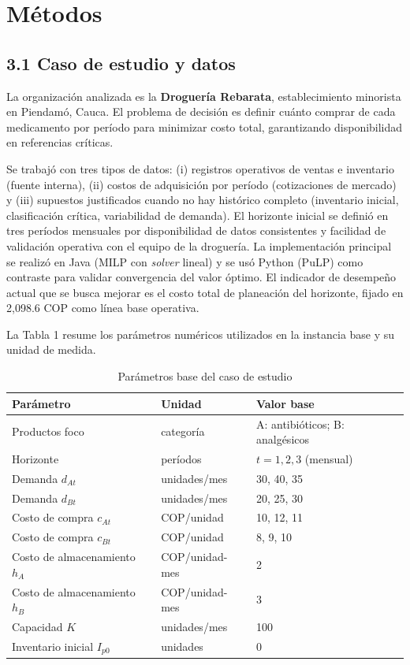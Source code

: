 \documentclass[12pt,letterpaper]{article}
\begin{document}
\section{Métodos}
\subsection{3.1 Caso de estudio y datos}
La organización analizada es la \textbf{Droguería Rebarata}, establecimiento minorista en Piendamó, Cauca. El problema de decisión es definir cuánto comprar de cada medicamento por período para minimizar costo total, garantizando disponibilidad en referencias críticas.

Se trabajó con tres tipos de datos: (i) registros operativos de ventas e inventario (fuente interna), (ii) costos de adquisición por período (cotizaciones de mercado) y (iii) supuestos justificados cuando no hay histórico completo (inventario inicial, clasificación crítica, variabilidad de demanda). El horizonte inicial se definió en tres períodos mensuales por disponibilidad de datos consistentes y facilidad de validación operativa con el equipo de la droguería. La implementación principal se realizó en Java (MILP con \textit{solver} lineal) y se usó Python (PuLP) como contraste para validar convergencia del valor óptimo. El indicador de desempeño actual que se busca mejorar es el costo total de planeación del horizonte, fijado en 2,098.6 COP como línea base operativa.

La Tabla 1 resume los parámetros numéricos utilizados en la instancia base y su unidad de medida.
\begin{table}[H]
\centering
\caption{Parámetros base del caso de estudio}
\begin{tabular}{|p{4.5cm}|p{4cm}|p{4.5cm}|}
\hline
\textbf{Parámetro} & \textbf{Unidad} & \textbf{Valor base} \\
\hline
Productos foco & categoría & A: antibióticos; B: analgésicos \\
\hline
Horizonte & períodos & $t=1,2,3$ (mensual) \\
\hline
Demanda $d_{At}$ & unidades/mes & 30, 40, 35 \\
\hline
Demanda $d_{Bt}$ & unidades/mes & 20, 25, 30 \\
\hline
Costo de compra $c_{At}$ & COP/unidad & 10, 12, 11 \\
\hline
Costo de compra $c_{Bt}$ & COP/unidad & 8, 9, 10 \\
\hline
Costo de almacenamiento $h_A$ & COP/unidad-mes & 2 \\
\hline
Costo de almacenamiento $h_B$ & COP/unidad-mes & 3 \\
\hline
Capacidad $K$ & unidades/mes & 100 \\
\hline
Inventario inicial $I_{p0}$ & unidades & 0 \\
\hline
\end{tabular}
\end{table}
\end{document}

